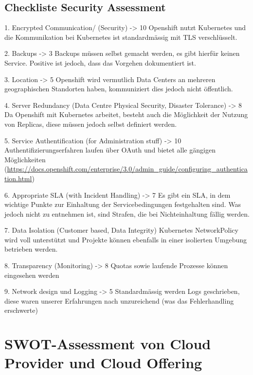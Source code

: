 \documentclass[12pt,a4paper]{article}
\begin{document}
\subsection{Checkliste Security Assessment}
1. Encrypted Communication/ (Security) -> 10
Openshift nutzt Kubernetes und die Kommunikation bei Kubernetes ist standardmässig mit TLS verschlüsselt.


2. Backups -> 3
Backups müssen selbst gemacht werden, es gibt hierfür keinen Service. Positive ist jedoch, dass das Vorgehen dokumentiert ist.


3. Location -> 5
Openshift wird vermutlich Data Centers an mehreren geographischen Standorten haben, kommuniziert dies jedoch nicht öffentlich.


4. Server Redundancy (Data Centre Physical Security, Disaster Tolerance) -> 8
Da Openshift mit Kubernetes arbeitet, besteht auch die Möglichkeit der Nutzung von Replicas, diese müssen jedoch selbst definiert werden.


5. Service Authentification (for Administration stuff) -> 10
Authentifizierungserfahren laufen über OAuth und bietet alle gängigen Möglichkeiten (\url{https://docs.openshift.com/enterprise/3.0/admin_guide/configuring_authentication.html})


6. Appropriate SLA (with Incident Handling) -> 7
Es gibt ein SLA, in dem wichtige Punkte zur Einhaltung der Servicebedingungen festgehalten sind. Was jedoch nicht zu entnehmen ist, sind Strafen, die bei Nichteinhaltung fällig werden.


7. Data Isolation (Customer based, Data Integrity)
Kubernetes NetworkPolicy wird voll unterstützt und Projekte können ebenfalls in einer isolierten Umgebung betrieben werden.


8. Transparency (Monitoring) -> 8
Quotas sowie laufende Prozesse können eingesehen werden


9. Network design und Logging -> 5
Standardmässig werden Logs geschrieben, diese waren unserer Erfahrungen nach unzureichend (was das Fehlerhandling erschwerte)


\section{SWOT-Assessment von Cloud Provider und Cloud Offering}
\end{document}

